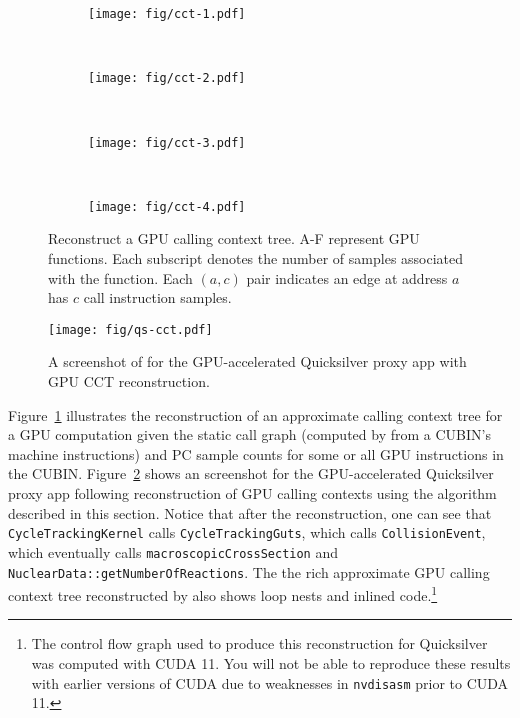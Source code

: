 \begin{figure}[t]
\centering
\begin{subfigure}{0.22\textwidth}
\centering
\texttt{[image: fig/cct-1.pdf]}
\caption{}
\end{subfigure}
~
\begin{subfigure}{0.22\textwidth}
\centering
\texttt{[image: fig/cct-2.pdf]}
\caption{}
\end{subfigure}
~
\begin{subfigure}{0.22\textwidth}
\centering
\texttt{[image: fig/cct-3.pdf]}
\caption{}
\end{subfigure}
~
\begin{subfigure}{0.22\textwidth}
\centering
\texttt{[image: fig/cct-4.pdf]}
\caption{}
\end{subfigure}
\caption{Reconstruct a GPU calling context tree. A-F represent GPU functions. Each subscript denotes the number of samples associated with the function. Each $(a, c)$ pair indicates an edge at address $a$ has $c$ call instruction samples.}
\label{fig:gpu calling context tree}
\end{figure}

\begin{figure}[t]
\centering
\texttt{[image: fig/qs-cct.pdf]}
\caption{A screenshot of \hpcviewer{} for the GPU-accelerated Quicksilver proxy app with GPU CCT reconstruction.}
\label{qs-cct}
\end{figure}

Figure~\ref{fig:gpu calling context tree} illustrates the reconstruction of an approximate calling context tree for a GPU computation given the static call graph (computed by \hpcstruct{} from a CUBIN's machine instructions) and PC sample counts for some or all GPU instructions in the CUBIN. Figure~\ref{qs-cct} shows an \hpcviewer{} screenshot for the GPU-accelerated Quicksilver proxy app following reconstruction of GPU calling contexts using the algorithm described in this section. Notice that after the reconstruction, one can see that \verb|CycleTrackingKernel| calls \verb|CycleTrackingGuts|, which calls \verb|CollisionEvent|, which eventually calls  \verb|macroscopicCrossSection| and \verb|NuclearData::getNumberOfReactions|. The the rich  approximate GPU calling context tree reconstructed by \hpcprof{} also shows loop nests and inlined code.\footnote{The control flow graph used to produce this reconstruction for Quicksilver was computed with CUDA 11. You will not be able to reproduce these results with earlier versions of CUDA due to weaknesses in  
{\tt nvdisasm} prior to CUDA 11.}

